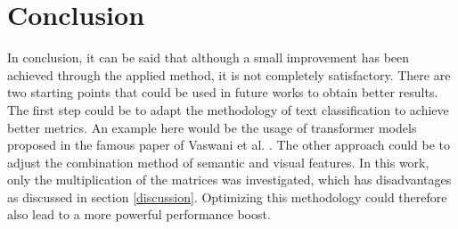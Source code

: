 \documentclass[conference]{IEEEtran}
\begin{document}
\newpage

\section{Conclusion}\label{conclusion}
In conclusion, it can be said that although a small improvement has been achieved through the applied method, it is not completely satisfactory. There are two starting points that could be used in future works to obtain better results. The first step could be to adapt the methodology of text classification to achieve better metrics. An example here would be the usage of transformer models proposed in the famous paper of Vaswani et al. \cite{vaswani2017attention}. The other approach could be to adjust the combination method of semantic and visual features. In this work, only the multiplication of the matrices was investigated, which has disadvantages as discussed in section \ref{discussion}. Optimizing this methodology could therefore also lead to a more powerful performance boost.



\end{document}
